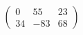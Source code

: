 \begin{displaymath}
\left (
\begin{array}{rrr}
0 & 55 & 23 \\
34 & -83 & 68 \end{array}
\right )
\end{displaymath}
